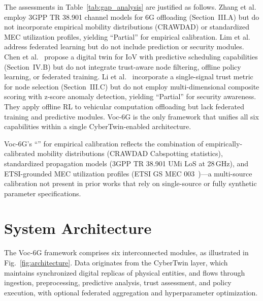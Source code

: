 \documentclass[journal,twoside]{IEEEtran}
\newcommand{\VocSixG}{Voc-6G}
\begin{document}
The assessments in Table~\ref{tab:gap_analysis} are justified as follows. Zhang et al.~\cite{ref_offload1} employ 3GPP TR 38.901 channel models for 6G offloading (Section~III.A) but do not incorporate empirical mobility distributions (CRAWDAD) or standardized MEC utilization profiles, yielding ``Partial'' for empirical calibration. Lim et al.~\cite{ref_fl_edge} address federated learning but do not include prediction or security modules. Chen et al.~\cite{ref_dtIoV} propose a digital twin for IoV with predictive scheduling capabilities (Section~IV.B) but do not integrate trust-aware node filtering, offline policy learning, or federated training. Li et al.~\cite{ref_offload2} incorporate a single-signal trust metric for node selection (Section~III.C) but do not employ multi-dimensional composite scoring with z-score anomaly detection, yielding ``Partial'' for security awareness. They apply offline RL to vehicular computation offloading but lack federated training and predictive modules. \VocSixG{} is the only framework that unifies all six capabilities within a single CyberTwin-enabled architecture.

\VocSixG{}'s ``\checkmark'' for empirical calibration reflects the combination of empirically-calibrated mobility distributions (CRAWDAD Cabspotting statistics), standardized propagation models (3GPP TR 38.901 UMi LoS at 28\,GHz), and ETSI-grounded MEC utilization profiles (ETSI GS MEC 003~\cite{etsi_mec003})---a multi-source calibration not present in prior works that rely on single-source or fully synthetic parameter specifications.


\section{System Architecture}
\label{sec:architecture}

The \VocSixG{} framework comprises six interconnected modules, as illustrated in Fig.~\ref{fig:architecture}. Data originates from the CyberTwin layer, which maintains synchronized digital replicas of physical entities, and flows through ingestion, preprocessing, predictive analysis, trust assessment, and policy execution, with optional federated aggregation and hyperparameter optimization.
\end{document}
